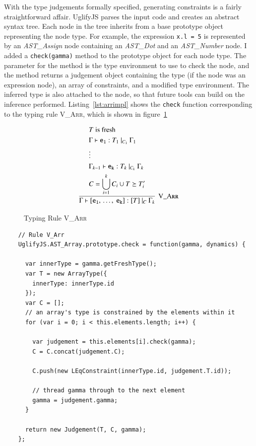 \documentclass[12pt,a4paper,twoside,openright]{report}
\theoremstyle{definition}
\theoremstyle{dotless}
\newcommand*{\js}{\texttt}
\begin{document}
With the type judgements formally specified, generating constraints is a fairly
straightforward affair.  UglifyJS parses the input code and creates an abstract
syntax tree. Each node in the tree inherits from a base prototype object
representing the node type.  For example, the expression \js{x.l = 5} is
represented by an \textit{AST\_Assign} node containing an \textit{AST\_Dot} and
an \textit{AST\_Number} node.  I added a \js{check(gamma)} method to the
prototype object for each node type. The parameter for the method is the type
environment to use to check the node, and the method returns a judgement object
containing the type (if the node was an expression node), an array of
constraints, and a modified type environment. The inferred type is also
attached to the node, so that future tools can build on the inference
performed. Listing~\ref{lst:arrimpl} shows the \js{check} function
corresponding to the typing rule \textsc{V\_Arr}, which is shown in figure~\ref{fig:arrrule}
\begin{figure}[t]
  $$\infer[\textsc{V\_Arr}]{
  	\Gamma\vdash\mathtt{[e_1,\, \ldots,\ e_k]}:[T]\ |_C\ \Gamma_k	
  }{ 
	\begin{split}
	  &T \textrm{ is fresh} \\
	  &\Gamma\vdash \mathtt{e_1}:T_1\ |_{C_1}\ \Gamma_1 \\
	  &\vdots \\
	  &\Gamma_{k-1}\vdash \mathtt{e_k}:T_k\ |_{C_k}\ \Gamma_k \\
	  &C=\bigcup_{i=1}^kC_i \cup {T \succeq T_i'}
	\end{split}	  
  }$$
  \label{fig:arrrule}
  \caption{Typing Rule \textsc{V\_Arr}}
\end{figure}
\begin{program}[t]
  \begin{verbatim}
    // Rule V_Arr
    UglifyJS.AST_Array.prototype.check = function(gamma, dynamics) {

      var innerType = gamma.getFreshType();
      var T = new ArrayType({
        innerType: innerType.id
      });
      var C = [];
      // an array's type is constrained by the elements within it
      for (var i = 0; i < this.elements.length; i++) {

        var judgement = this.elements[i].check(gamma);
        C = C.concat(judgement.C);

        C.push(new LEqConstraint(innerType.id, judgement.T.id));

        // thread gamma through to the next element
        gamma = judgement.gamma;
      }

      return new Judgement(T, C, gamma);
    };
  \end{verbatim}
  \caption{The implementation of \textsc{V\_Arr}}\label{lst:arrimpl}
\end{program}
\end{document}
